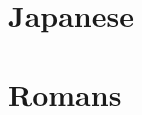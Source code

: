 \documentclass[a4paper]{book}
\begin{document}
\section{\Gls{Japanese}}
\section{\Gls{Romans}}

\printglossary
\end{document}
